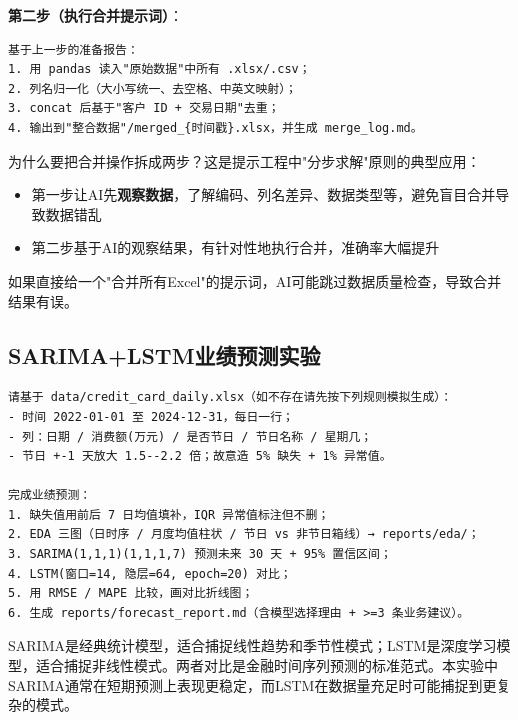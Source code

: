 \textbf{第二步（执行合并提示词）}：

\begin{lstlisting}
基于上一步的准备报告：
1. 用 pandas 读入"原始数据"中所有 .xlsx/.csv；
2. 列名归一化（大小写统一、去空格、中英文映射）；
3. concat 后基于"客户 ID + 交易日期"去重；
4. 输出到"整合数据"/merged_{时间戳}.xlsx，并生成 merge_log.md。
\end{lstlisting}

\begin{theorybox}[分步提示的策略意义]
为什么要把合并操作拆成两步？这是提示工程中"分步求解"原则的典型应用：
\begin{itemize}[leftmargin=2em]
  \item 第一步让AI先\textbf{观察数据}，了解编码、列名差异、数据类型等，避免盲目合并导致数据错乱
  \item 第二步基于AI的观察结果，有针对性地执行合并，准确率大幅提升
\end{itemize}
如果直接给一个"合并所有Excel"的提示词，AI可能跳过数据质量检查，导致合并结果有误。
\end{theorybox}

\subsection{SARIMA+LSTM业绩预测实验}

\begin{lstlisting}
请基于 data/credit_card_daily.xlsx（如不存在请先按下列规则模拟生成）：
- 时间 2022-01-01 至 2024-12-31，每日一行；
- 列：日期 / 消费额(万元) / 是否节日 / 节日名称 / 星期几；
- 节日 +-1 天放大 1.5--2.2 倍；故意造 5% 缺失 + 1% 异常值。

完成业绩预测：
1. 缺失值用前后 7 日均值填补，IQR 异常值标注但不删；
2. EDA 三图（日时序 / 月度均值柱状 / 节日 vs 非节日箱线）→ reports/eda/；
3. SARIMA(1,1,1)(1,1,1,7) 预测未来 30 天 + 95% 置信区间；
4. LSTM(窗口=14, 隐层=64, epoch=20) 对比；
5. 用 RMSE / MAPE 比较，画对比折线图；
6. 生成 reports/forecast_report.md（含模型选择理由 + >=3 条业务建议）。
\end{lstlisting}

\begin{notebox}[模型选择解读]
SARIMA是经典统计模型，适合捕捉线性趋势和季节性模式；LSTM是深度学习模型，适合捕捉非线性模式。两者对比是金融时间序列预测的标准范式。本实验中SARIMA通常在短期预测上表现更稳定，而LSTM在数据量充足时可能捕捉到更复杂的模式。
\end{notebox}

